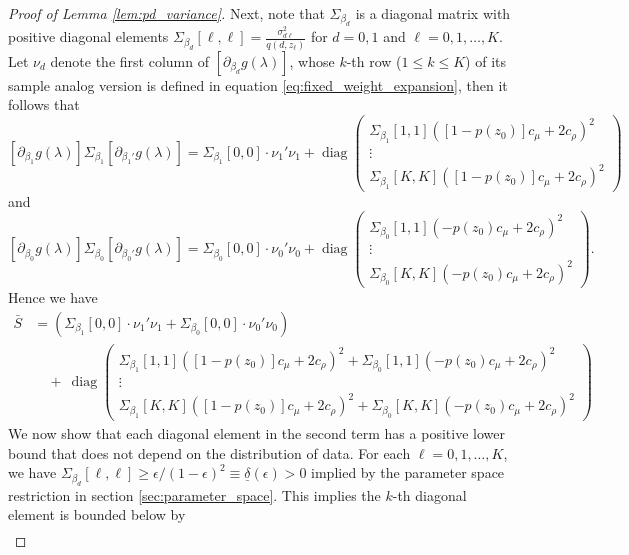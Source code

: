 \documentclass[11pt]{article}
\theoremstyle{definition}
\DeclareMathOperator*{\diag}{diag}
\newcommand{\0}{\ensuremath{\mathbf{0}}}
\begin{document}
\begin{bibunit}
\begin{proof}[Proof of Lemma \ref{lem:pd_variance}]
Next, note that $\Sigma_{\beta_d}$ is a diagonal matrix with positive diagonal elements $\Sigma_{\beta_d}[\ell,\ell] = \frac{\sigma^2_{d\ell}}{q(d,z_\ell)}$ for $d = 0,1$ and $\ell = 0,1,\ldots,K$. Let $\nu_d$ denote the first column of $[\partial_{\beta_d}g(\lambda)]$, whose $k$-th row ($1\leq k \leq K$) of its sample analog version is defined in equation \eqref{eq:fixed_weight_expansion}, then it follows that 
\[
    [\partial_{\beta_1}g(\lambda)] \Sigma_{\beta_1} [\partial_{\beta_1'}g(\lambda)]
    =
    \Sigma_{\beta_1}[0,0]\cdot \nu_1'\nu_1 + 
    \diag
    \begin{pmatrix}
        \Sigma_{\beta_1}[1,1]([1 - p(z_0)]c_\mu + 2c_\rho)^2 \\
        \vdots \\
        \Sigma_{\beta_1}[K,K]([1 - p(z_0)]c_\mu + 2c_\rho)^2
    \end{pmatrix}
\]
and 
\[
    [\partial_{\beta_0}g(\lambda)] \Sigma_{\beta_0} [\partial_{\beta_0'}g(\lambda)]
    =
    \Sigma_{\beta_0}[0,0]\cdot \nu_0'\nu_0 + 
    \diag
    \begin{pmatrix}
        \Sigma_{\beta_0}[1,1](- p(z_0)c_\mu + 2c_\rho)^2 \\
        \vdots \\
        \Sigma_{\beta_0}[K,K](- p(z_0)c_\mu + 2c_\rho)^2
    \end{pmatrix}.
\]
Hence we have
\begin{align*}
    \bar{S} 
    &= \left(\Sigma_{\beta_1}[0,0] \cdot \nu_1'\nu_1 + \Sigma_{\beta_0}[0,0] \cdot \nu_0'\nu_0\right) \\
    &\quad + ~ 
    \diag
    \begin{pmatrix}
        \Sigma_{\beta_1}[1,1]([1 - p(z_0)]c_\mu + 2c_\rho)^2 + \Sigma_{\beta_0}[1,1](- p(z_0)c_\mu + 2c_\rho)^2 \\
        \vdots \\
        \Sigma_{\beta_1}[K,K]([1 - p(z_0)]c_\mu + 2c_\rho)^2 +
        \Sigma_{\beta_0}[K,K](- p(z_0)c_\mu + 2c_\rho)^2
    \end{pmatrix}
\end{align*}
We now show that each diagonal element in the second term has a positive lower bound that does not depend on the distribution of data. For each $\ell = 0,1,\ldots,K$, we have $\Sigma_{\beta_d}[\ell,\ell] \geq \epsilon/(1-\epsilon)^2 \equiv \underline{\delta}(\epsilon) > 0$ implied by the parameter space restriction in section \ref{sec:parameter_space}. This implies the $k$-th diagonal element is bounded below by
\begin{align*}

\end{align*}
\end{proof}
\end{bibunit}
\end{document}
